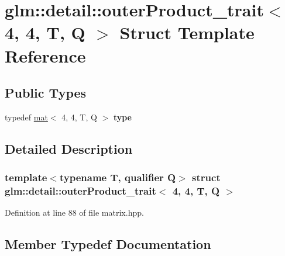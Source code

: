\hypertarget{structglm_1_1detail_1_1outerProduct__trait_3_014_00_014_00_01T_00_01Q_01_4}{}\section{glm\+:\+:detail\+:\+:outer\+Product\+\_\+trait$<$ 4, 4, T, Q $>$ Struct Template Reference}
\label{structglm_1_1detail_1_1outerProduct__trait_3_014_00_014_00_01T_00_01Q_01_4}
\subsection*{Public Types}
\begin{DoxyCompactItemize}
\item 
\mbox{\label{structglm_1_1detail_1_1outerProduct__trait_3_014_00_014_00_01T_00_01Q_01_4_a8406d33a053d454b8546830f1d2ad668}} 
typedef \hyperlink{structglm_1_1mat}{mat}$<$ 4, 4, T, Q $>$ {\bfseries type}
\end{DoxyCompactItemize}


\subsection{Detailed Description}
\subsubsection*{template$<$typename T, qualifier Q$>$\newline
struct glm\+::detail\+::outer\+Product\+\_\+trait$<$ 4, 4, T, Q $>$}



Definition at line 88 of file matrix.\+hpp.



\subsection{Member Typedef Documentation}
\mbox{\label{structglm_1_1detail_1_1outerProduct__trait_3_014_00_014_00_01T_00_01Q_01_4_a8406d33a053d454b8546830f1d2ad668}} 
